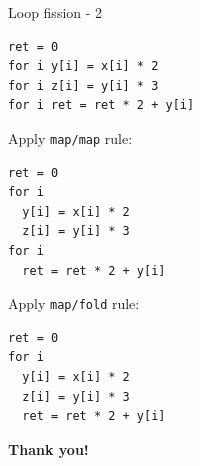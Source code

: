 \documentclass[handout]{beamer}
\begin{document}
\begin{frame}[fragile]{Loop fission - 2}

\begin{lstlisting}
ret = 0
for i y[i] = x[i] * 2
for i z[i] = y[i] * 3
for i ret = ret * 2 + y[i]
\end{lstlisting}

Apply {\tt map/map} rule:

\begin{lstlisting}
ret = 0
for i
  y[i] = x[i] * 2
  z[i] = y[i] * 3
for i
  ret = ret * 2 + y[i]
\end{lstlisting}

Apply {\tt map/fold} rule:

\begin{lstlisting}
ret = 0
for i
  y[i] = x[i] * 2
  z[i] = y[i] * 3
  ret = ret * 2 + y[i]
\end{lstlisting}

\end{frame}

\begin{frame}
\centerline{\Huge\bf Thank you!}
\end{frame}
\end{document}
